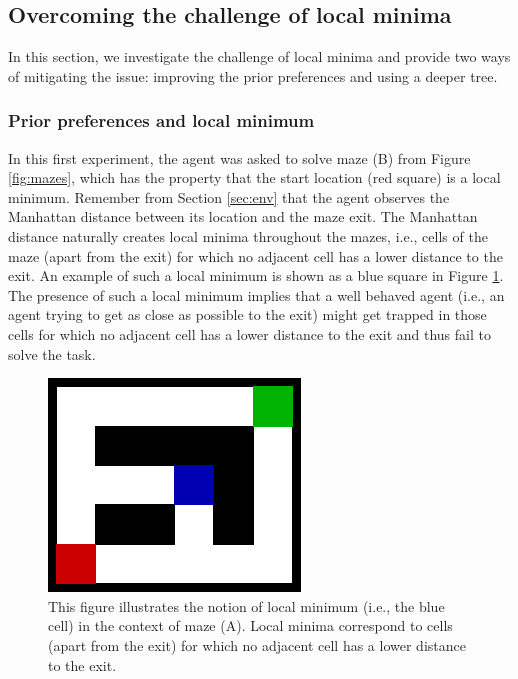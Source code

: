 \documentclass[twoside,11pt]{article}
\begin{document}
\subsection{Overcoming the challenge of local minima}\label{sec:results_intuition}

In this section, we investigate the challenge of local minima and provide two ways of mitigating the issue: improving the prior preferences and using a deeper tree. 

\subsubsection{Prior preferences and local minimum} \label{sec:pp_and_lm}

In this first experiment, the agent was asked to solve maze (B) from Figure \ref{fig:mazes}, which has the property that the start location (red square) is a local minimum. Remember from Section \ref{sec:env} that the agent observes the Manhattan distance between its location and the maze exit. The Manhattan distance naturally creates local minima throughout the mazes, i.e., cells of the maze (apart from the exit) for which no adjacent cell has a lower distance to the exit. An example of such a local minimum is shown as a blue square in Figure \ref{fig:local_min}. The presence of such a local minimum implies that a well behaved agent (i.e., an agent trying to get as close as possible to the exit) might get trapped in those cells for which no adjacent cell has a lower distance to the exit and thus fail to solve the task.

\begin{figure}[H]
	\begin{center}
	\includegraphics[scale=1]{BTAI_Empirical_Article-figure4}
	\end{center}
\vspace{-0.25cm}
    \caption{
This figure illustrates the notion of local minimum (i.e., the blue cell) in the context of maze (A). Local minima correspond to cells (apart from the exit) for which no adjacent cell has a lower distance to the exit.}
    \label{fig:local_min}
\end{figure}
\end{document}
